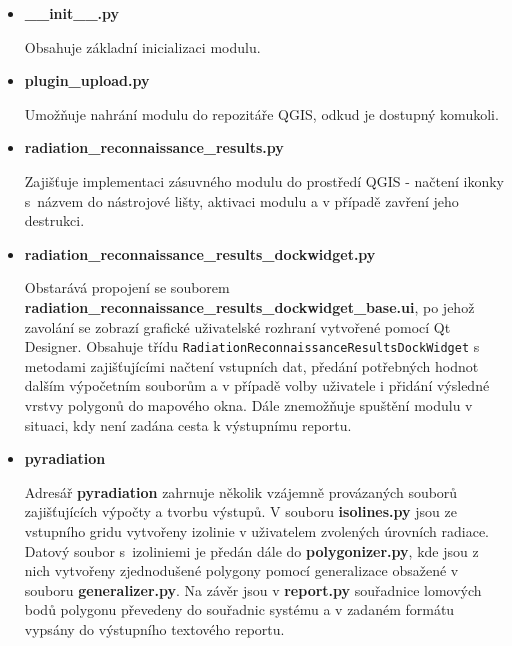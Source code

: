 \begin{itemize}
	\item \textbf{\_\_init\_\_.py} 
	
	Obsahuje základní inicializaci modulu.
		
	\item \textbf{plugin\_upload.py} 

          Umožňuje nahrání modulu do repozitáře QGIS, odkud je
          dostupný komukoli.

	\item \textbf{radiation\_reconnaissance\_results.py} 
	
          Zajišťuje implementaci zásuvného modulu do prostředí QGIS -
          načtení ikonky s~názvem do nástrojové lišty, aktivaci modulu
          a v případě zavření jeho destrukci.

	\item \textbf{radiation\_reconnaissance\_results\_dockwidget.py}
	
          Obstarává propojení se souborem\\
          \textbf{radiation\_reconnaissance\_results\_dockwidget\_base.ui},
          po jehož zavolání se zobrazí grafické uživatelské rozhraní
          vytvořené pomocí Qt Designer. Obsahuje třídu
          \texttt{RadiationReconnaissanceResultsDockWidget} s metodami
          zajišťujícími načtení vstupních dat, předání potřebných
          hodnot dalším výpočetním souborům a v případě volby
          uživatele i přidání výsledné vrstvy polygonů do mapového
          okna. Dále znemožňuje spuštění modulu v situaci, kdy není
          zadána cesta k výstupnímu reportu.

	\item \textbf{pyradiation}

          Adresář \textbf{pyradiation} zahrnuje několik vzájemně
          provázaných souborů zajišťujících výpočty a tvorbu
          výstupů. V souboru \textbf{isolines.py} jsou ze vstupního
          gridu vytvořeny izolinie v uživatelem zvolených úrovních
          radiace. Datový soubor s~izoliniemi je předán dále do
          \textbf{polygonizer.py}, kde jsou z nich vytvořeny
          zjednodušené polygony pomocí generalizace obsažené v souboru
          \textbf{generalizer.py}. Na závěr jsou v \textbf{report.py}
          souřadnice lomových bodů polygonu převedeny do souřadnic
          systému  a v zadaném formátu vypsány do výstupního
          textového reportu.
	
\end{itemize}

